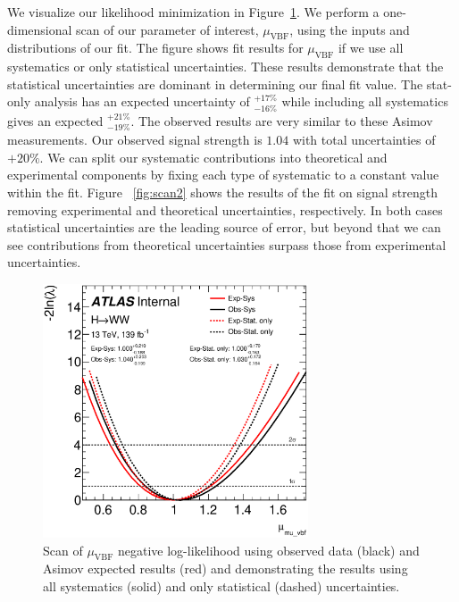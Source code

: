 We visualize our likelihood minimization in Figure~\ref{fig:scan}. We perform a one-dimensional scan of our parameter of interest, $\mu_{\text{VBF}}$, using the inputs and distributions of our fit. The figure shows fit results for $\mu_{\text{VBF}}$ if we use all systematics or only statistical uncertainties. These results demonstrate that the statistical uncertainties are dominant in determining our final fit value. The stat-only analysis has an expected uncertainty of $^{+17\%}_{-16\%}$ while including all systematics gives an expected $^{+21\%}_{-19\%}$. The observed results are very similar to these Asimov measurements. Our observed signal strength is $1.04$ with total uncertainties of $+20\%$. We can split our systematic contributions into theoretical and experimental components by fixing each type of systematic to a constant value within the fit. Figure ~\ref{fig:scan2} shows the results of the fit on signal strength removing experimental and theoretical uncertainties, respectively. In both cases statistical uncertainties are the leading source of error, but beyond that we can see contributions from theoretical uncertainties surpass those from experimental uncertainties.  

\begin{figure}[!h]
\centering
\includegraphics[width=0.7\textwidth]{Pictures/fitresults/mu_vbf_stattotal.eps}
\caption{Scan of $\mu_{\text{VBF}}$ negative log-likelihood using observed data (black) and Asimov expected results (red) and demonstrating the results using all systematics (solid) and only statistical (dashed) uncertainties.}
\label{fig:scan}
\end{figure}

